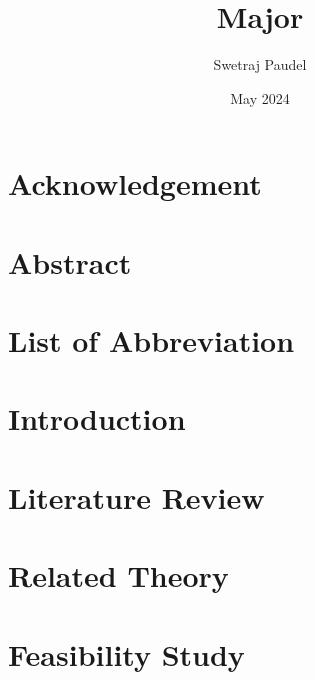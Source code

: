 \documentclass[12pt,a4paper]{report}
\title{Major}
\author{Swetraj Paudel}
\date{May 2024}
\begin{document}



\chapter*{Acknowledgement}
\label{acknowledgement}


\chapter*{Abstract}
\label{abstract}


\tableofcontents
\thispagestyle{empty}
\addtocounter{page}{-1}
\newpage

\listoffigures
{}
\newpage

\listoftables
{}
\newpage

\chapter*{List of Abbreviation}
\label{abbreviation}

\newpage


\chapter{Introduction}
\label{introduction}


\chapter{Literature Review}
\label{literaturereview}


\chapter{Related Theory}
\label{relatedtheory}


\chapter{Feasibility Study}
\label{feasiblity}

\end{document}
